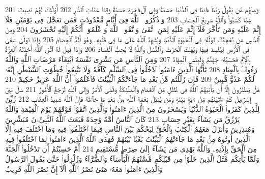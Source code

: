 {\tiny\colorbox{cl_aya}{201}} وَمِنْهُم مَّن يَقُولُ رَبَّنَآ ءَاتِنَا فِى ٱلدُّنْيَا حَسَنَةً وَفِى ٱلْءَاخِرَةِ حَسَنَةً وَقِنَا عَذَابَ ٱلنَّارِ
{\tiny\colorbox{cl_aya}{202}} أُو۟لَٰٓئِكَ لَهُمْ نَصِيبٌ مِّمَّا كَسَبُوا۟ وَٱللَّهُ سَرِيعُ ٱلْحِسَابِ
{\tiny\colorbox{cl_aya}{203}} وَٱذْكُرُوا۟ ٱللَّهَ فِىٓ أَيَّامٍ مَّعْدُودَٰتٍ فَمَن تَعَجَّلَ فِى يَوْمَيْنِ فَلَآ إِثْمَ عَلَيْهِ وَمَن تَأَخَّرَ فَلَآ إِثْمَ عَلَيْهِ لِمَنِ ٱتَّقَىٰ وَٱتَّقُوا۟ ٱللَّهَ وَٱعْلَمُوٓا۟ أَنَّكُمْ إِلَيْهِ تُحْشَرُونَ
{\tiny\colorbox{cl_aya}{204}} وَمِنَ ٱلنَّاسِ مَن يُعْجِبُكَ قَوْلُهُۥ فِى ٱلْحَيَوٰةِ ٱلدُّنْيَا وَيُشْهِدُ ٱللَّهَ عَلَىٰ مَا فِى قَلْبِهِۦ وَهُوَ أَلَدُّ ٱلْخِصَامِ
{\tiny\colorbox{cl_aya}{205}} وَإِذَا تَوَلَّىٰ سَعَىٰ فِى ٱلْأَرْضِ لِيُفْسِدَ فِيهَا وَيُهْلِكَ ٱلْحَرْثَ وَٱلنَّسْلَ وَٱللَّهُ لَا يُحِبُّ ٱلْفَسَادَ
{\tiny\colorbox{cl_aya}{206}} وَإِذَا قِيلَ لَهُ ٱتَّقِ ٱللَّهَ أَخَذَتْهُ ٱلْعِزَّةُ بِٱلْإِثْمِ فَحَسْبُهُۥ جَهَنَّمُ وَلَبِئْسَ ٱلْمِهَادُ
{\tiny\colorbox{cl_aya}{207}} وَمِنَ ٱلنَّاسِ مَن يَشْرِى نَفْسَهُ ٱبْتِغَآءَ مَرْضَاتِ ٱللَّهِ وَٱللَّهُ رَءُوفٌۢ بِٱلْعِبَادِ
{\tiny\colorbox{cl_aya}{208}} يَٰٓأَيُّهَا ٱلَّذِينَ ءَامَنُوا۟ ٱدْخُلُوا۟ فِى ٱلسِّلْمِ كَآفَّةً وَلَا تَتَّبِعُوا۟ خُطُوَٰتِ ٱلشَّيْطَٰنِ إِنَّهُۥ لَكُمْ عَدُوٌّ مُّبِينٌ
{\tiny\colorbox{cl_aya}{209}} فَإِن زَلَلْتُم مِّنۢ بَعْدِ مَا جَآءَتْكُمُ ٱلْبَيِّنَٰتُ فَٱعْلَمُوٓا۟ أَنَّ ٱللَّهَ عَزِيزٌ حَكِيمٌ
{\tiny\colorbox{cl_aya}{210}} هَلْ يَنظُرُونَ إِلَّآ أَن يَأْتِيَهُمُ ٱللَّهُ فِى ظُلَلٍ مِّنَ ٱلْغَمَامِ وَٱلْمَلَٰٓئِكَةُ وَقُضِىَ ٱلْأَمْرُ وَإِلَى ٱللَّهِ تُرْجَعُ ٱلْأُمُورُ
{\tiny\colorbox{cl_aya}{211}} سَلْ بَنِىٓ إِسْرَٰٓءِيلَ كَمْ ءَاتَيْنَٰهُم مِّنْ ءَايَةٍۭ بَيِّنَةٍ وَمَن يُبَدِّلْ نِعْمَةَ ٱللَّهِ مِنۢ بَعْدِ مَا جَآءَتْهُ فَإِنَّ ٱللَّهَ شَدِيدُ ٱلْعِقَابِ
{\tiny\colorbox{cl_aya}{212}} زُيِّنَ لِلَّذِينَ كَفَرُوا۟ ٱلْحَيَوٰةُ ٱلدُّنْيَا وَيَسْخَرُونَ مِنَ ٱلَّذِينَ ءَامَنُوا۟ وَٱلَّذِينَ ٱتَّقَوْا۟ فَوْقَهُمْ يَوْمَ ٱلْقِيَٰمَةِ وَٱللَّهُ يَرْزُقُ مَن يَشَآءُ بِغَيْرِ حِسَابٍ
{\tiny\colorbox{cl_aya}{213}} كَانَ ٱلنَّاسُ أُمَّةً وَٰحِدَةً فَبَعَثَ ٱللَّهُ ٱلنَّبِيِّۦنَ مُبَشِّرِينَ وَمُنذِرِينَ وَأَنزَلَ مَعَهُمُ ٱلْكِتَٰبَ بِٱلْحَقِّ لِيَحْكُمَ بَيْنَ ٱلنَّاسِ فِيمَا ٱخْتَلَفُوا۟ فِيهِ وَمَا ٱخْتَلَفَ فِيهِ إِلَّا ٱلَّذِينَ أُوتُوهُ مِنۢ بَعْدِ مَا جَآءَتْهُمُ ٱلْبَيِّنَٰتُ بَغْيًۢا بَيْنَهُمْ فَهَدَى ٱللَّهُ ٱلَّذِينَ ءَامَنُوا۟ لِمَا ٱخْتَلَفُوا۟ فِيهِ مِنَ ٱلْحَقِّ بِإِذْنِهِۦ وَٱللَّهُ يَهْدِى مَن يَشَآءُ إِلَىٰ صِرَٰطٍ مُّسْتَقِيمٍ
{\tiny\colorbox{cl_aya}{214}} أَمْ حَسِبْتُمْ أَن تَدْخُلُوا۟ ٱلْجَنَّةَ وَلَمَّا يَأْتِكُم مَّثَلُ ٱلَّذِينَ خَلَوْا۟ مِن قَبْلِكُم مَّسَّتْهُمُ ٱلْبَأْسَآءُ وَٱلضَّرَّآءُ وَزُلْزِلُوا۟ حَتَّىٰ يَقُولَ ٱلرَّسُولُ وَٱلَّذِينَ ءَامَنُوا۟ مَعَهُۥ مَتَىٰ نَصْرُ ٱللَّهِ أَلَآ إِنَّ نَصْرَ ٱللَّهِ قَرِيبٌ
